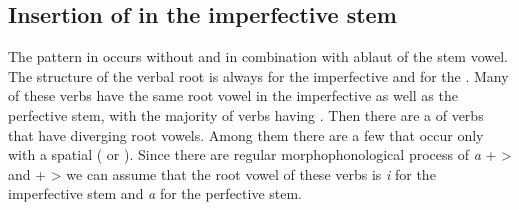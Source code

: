 
\subsection{Insertion of  in the imperfective stem}
\label{ssec:Insertion of r in the imperfective stem}

The pattern in  occurs without and in combination with ablaut of the stem vowel. The structure of the verbal root is always  for the imperfective and  for the . Many of these verbs have the same root vowel in the imperfective as well as the perfective stem, with the majority of verbs having . Then there are a  of verbs that have diverging root vowels. Among them there are a few that occur only with a spatial  ( or ). Since there are regular morphophonological process of \textit{a} +  >  and  +  >  we can assume that the root vowel of these verbs is \textit{i} for the imperfective stem and \textit{a} for the perfective stem.

